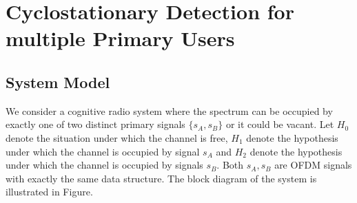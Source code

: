 \section{Cyclostationary Detection for multiple Primary Users}
\subsection{System Model}

We consider a cognitive radio system where the spectrum can be occupied by exactly one of two distinct primary signals $\{s_A, s_B\}$ or it could be vacant. Let $H_0$ denote the situation under which the channel is free, $H_1$ denote the hypothesis under which the channel is occupied by signal $s_A$ and $H_2$ denote the hypothesis under which the channel is occupied by signals $s_B$. Both $s_A, s_B$ are OFDM signals with exactly the same data structure. The block diagram of the system is illustrated in Figure.


